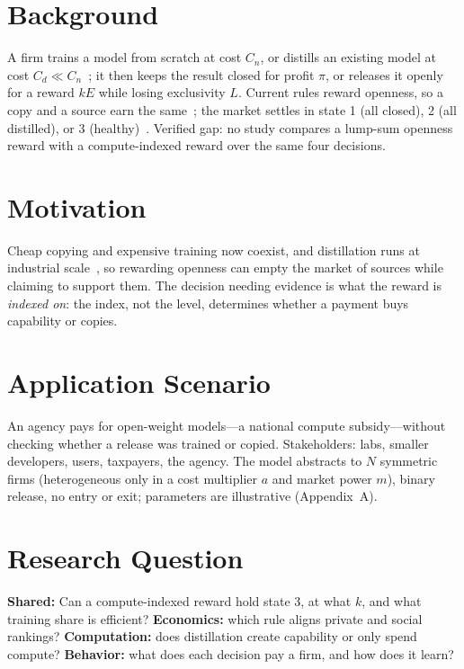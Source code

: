 \section{Background}
A firm trains a model from scratch at cost $C_n$, or distills an existing model at cost $C_d\ll C_n$~\cite{hinton2015,acl2024distill}; it then keeps the result closed for profit $\pi$, or releases it openly for a reward $kE$ while losing exclusivity $L$. Current rules reward openness, so a copy and a source earn the same~\cite{qiu2025,epoch2025}; the market settles in state 1 (all closed), 2 (all distilled), or 3 (healthy)~\cite{habibi2025,xu2025}. Verified gap: no study compares a lump-sum openness reward with a compute-indexed reward over the same four decisions.

\section{Motivation}
Cheap copying and expensive training now coexist, and distillation runs at industrial scale~\cite{cisa2026}, so rewarding openness can empty the market of sources while claiming to support them. The decision needing evidence is what the reward is \emph{indexed on}: the index, not the level, determines whether a payment buys capability or copies.

\section{Application Scenario}
An agency pays for open-weight models---a national compute subsidy---without checking whether a release was trained or copied. Stakeholders: labs, smaller developers, users, taxpayers, the agency. The model abstracts to $N$ symmetric firms (heterogeneous only in a cost multiplier $a$ and market power $m$), binary release, no entry or exit; parameters are illustrative (Appendix~A).

\section{Research Question}
\textbf{Shared:} Can a compute-indexed reward hold state 3, at what $k$, and what training share is efficient? \textbf{Economics:} which rule aligns private and social rankings? \textbf{Computation:} does distillation create capability or only spend compute? \textbf{Behavior:} what does each decision pay a firm, and how does it learn?

